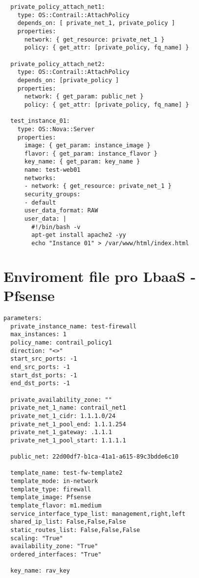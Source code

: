 \begin{lstlisting}
  private_policy_attach_net1:
    type: OS::Contrail::AttachPolicy
    depends_on: [ private_net_1, private_policy ]
    properties:
      network: { get_resource: private_net_1 }
      policy: { get_attr: [private_policy, fq_name] }

  private_policy_attach_net2:
    type: OS::Contrail::AttachPolicy
    depends_on: [private_policy ]
    properties:
      network: { get_param: public_net }
      policy: { get_attr: [private_policy, fq_name] }

  test_instance_01:
    type: OS::Nova::Server
    properties:
      image: { get_param: instance_image }
      flavor: { get_param: instance_flavor }
      key_name: { get_param: key_name }
      name: test-web01
      networks:
      - network: { get_resource: private_net_1 }
      security_groups:
      - default
      user_data_format: RAW
      user_data: |
        #!/bin/bash -v
        apt-get install apache2 -yy
        echo "Instance 01" > /var/www/html/index.html
\end{lstlisting}

\chapter{Enviroment file pro LbaaS - Pfsense}
\begin{lstlisting}
parameters:
  private_instance_name: test-firewall
  max_instances: 1
  policy_name: contrail_policy1
  direction: "<>"
  start_src_ports: -1
  end_src_ports: -1
  start_dst_ports: -1
  end_dst_ports: -1

  private_availability_zone: ""
  private_net_1_name: contrail_net1
  private_net_1_cidr: 1.1.1.0/24
  private_net_1_pool_end: 1.1.1.254
  private_net_1_gateway: .1.1.1
  private_net_1_pool_start: 1.1.1.1

  public_net: 22d00df7-b1ca-41a1-a615-89c3bdde6c10

  template_name: test-fw-template2
  template_mode: in-network
  template_type: firewall
  template_image: Pfsense
  template_flavor: m1.medium
  service_interface_type_list: management,right,left
  shared_ip_list: False,False,False
  static_routes_list: False,False,False
  scaling: "True"
  availability_zone: "True"
  ordered_interfaces: "True"

  key_name: rav_key
\end{lstlisting}

